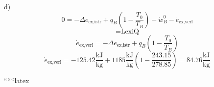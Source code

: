 d)
\[
0 = -\Delta e_{\text{ex,istr}} + q_B \left( 1 - \frac{T_0}{T_B} \right) - \dot{w}_B^0 - \dot{e}_{\text{ex,verl}}
\]
\[
= \text{LexiQ}
\]
\[
\dot{e}_{\text{ex,verl}} = -\Delta e_{\text{ex,istr}} + q_B \left( 1 - \frac{T_0}{T_B} \right)
\]
\[
\dot{e}_{\text{ex,verl}} = -125.42 \frac{\text{kJ}}{\text{kg}} + 1185 \frac{\text{kJ}}{\text{kg}} \left( 1 - \frac{243.15}{278.85} \right) = 84.76 \frac{\text{kJ}}{\text{kg}}
\]

``````latex